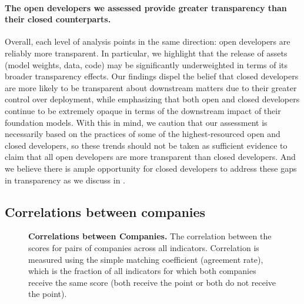 \paragraph{The open developers we assessed provide greater transparency than their closed counterparts.}
Overall, each level of analysis points in the same direction: open developers are reliably more transparent.
In particular, we highlight that the release of assets (\eg model weights, data, code) may be significantly underweighted in terms of its broader transparency effects.
Our findings dispel the belief that closed developers are more likely to be transparent about downstream matters due to their greater control over deployment, while emphasizing that both open and closed developers continue to be extremely opaque in terms of the downstream impact of their foundation models.
With this in mind, we caution that our assessment is necessarily based on the practices of some of the highest-resourced open and closed developers, so these trends should not be taken as sufficient evidence to claim that all open developers are more transparent than closed developers.
And we believe there is ample opportunity for closed developers to address these gaps in transparency as we discuss in .

\hypertarget{correlations}{\subsection{Correlations between companies}}
\label{sec:correlations}
\begin{figure}
\caption{\textbf{Correlations between Companies.} The correlation between the scores for pairs of companies across all indicators. Correlation is measured using the simple matching coefficient (\ie agreement rate), which is the fraction of all indicators for which both companies receive the same score (\ie both receive the point or both do not receive the point).
}
\label{fig:overall-correlations}
\end{figure}
